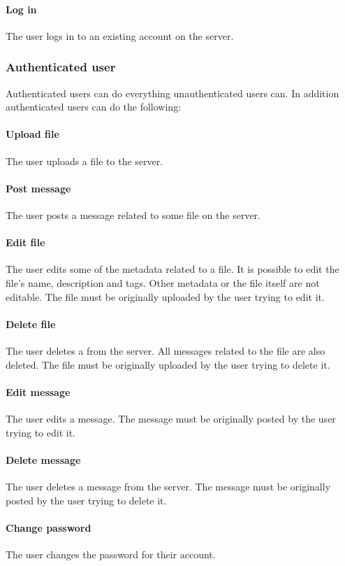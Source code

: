 \documentclass[10pt,a4paper]{article}
\begin{document}
\paragraph{Log in}
The user logs in to an existing account on the server.


\subsubsection{Authenticated user}
Authenticated users can do everything unauthenticated users can. In addition authenticated users can do the following:
\paragraph{Upload file}
The user uploads a file to the server.
\paragraph{Post message}
The user posts a message related to some file on the server.
\paragraph{Edit file}
The user edits some of the metadata related to a file. It is possible to edit the file's name, description and tags. Other metadata or the file itself are not editable. The file must be originally uploaded by the user trying to edit it.
\paragraph{Delete file}
The user deletes a from the server. All messages related to the file are also deleted. The file must be originally uploaded by the user trying to delete it.
\paragraph{Edit message}
The user edits a message. The message must be originally posted by the user trying to edit it.
\paragraph{Delete message}
The user deletes a message from the server. The message must be originally posted by the user trying to delete it.
\paragraph{Change password}
The user changes the password for their account.
\end{document}
